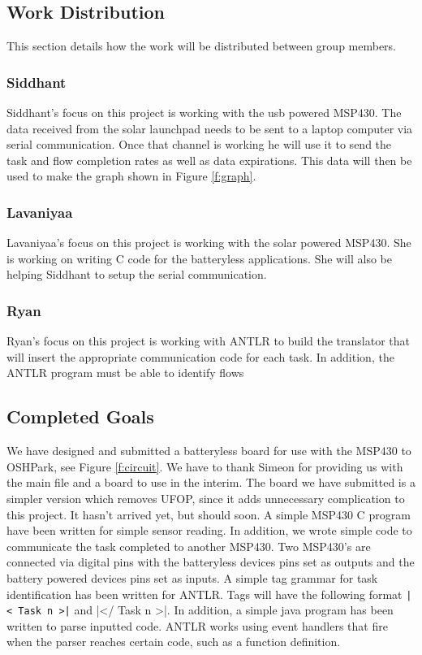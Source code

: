\subsection{Work Distribution}

This section details how the work will be distributed between group members.

\subsubsection{Siddhant}
Siddhant's focus on this project is working with the usb powered MSP430.
The data received from the solar launchpad needs to be sent to a laptop computer via serial communication.
Once that channel is working he will use it to send the task and flow completion rates as well as data expirations.
This data will then be used to make the graph shown in Figure \ref{f:graph}.

\subsubsection{Lavaniyaa}
Lavaniyaa's focus on this project is working with the solar powered MSP430.
She is working on writing C code for the batteryless applications.
She will also be helping Siddhant to setup the serial communication.

\subsubsection{Ryan}
Ryan's focus on this project is working with ANTLR to build the translator that will insert the appropriate communication code for each task.
In addition, the ANTLR program must be able to identify flows

\subsection{Completed Goals}

We have designed and submitted a batteryless board for use with the MSP430 to OSHPark, see Figure \ref{f:circuit}.
We have to thank Simeon for providing us with the main file and a board to use in the interim.
The board we have submitted is a simpler version which removes UFOP, since it adds unnecessary complication to this project.
It hasn't arrived yet, but should soon.
A simple MSP430 C program have been written for simple sensor reading.
In addition, we wrote simple code to communicate the task completed to another MSP430.
Two MSP430's are connected via digital pins with the batteryless devices pins set as outputs and the battery powered devices pins set as inputs.
A simple tag grammar for task identification has been written for ANTLR.
Tags will have the following format {\tt |< Task n >|} and |</ Task n >|.
In addition, a simple java program has been written to parse inputted code.
ANTLR works using event handlers that fire when the parser reaches certain code, such as a function definition.

